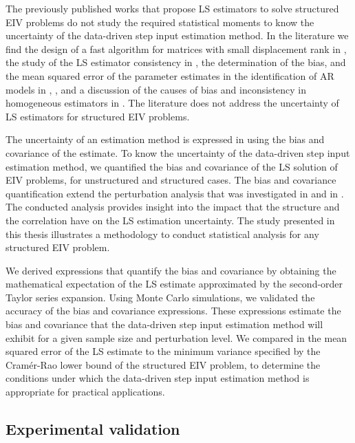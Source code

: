 The previously published works that propose LS estimators to solve structured EIV problems do not study the required statistical moments to know the uncertainty of the data-driven step input estimation method.
In the literature we find 
the design of a fast algorithm for matrices with small displacement rank in \citet{Mastronardi07fast}, 
the study of the LS estimator consistency in \citet{Palanthandalam10parameter},
the determination of the bias, and the mean squared error of the parameter estimates in the identification of AR models in \citet{Kiviet12high}, \citet{Kiviet14improved}, and
a discussion of the causes of bias and inconsistency in homogeneous estimators in \citet{Yeredor04homogeneous}.
The literature does not address the uncertainty of LS estimators for structured EIV problems.

The uncertainty of an estimation method is expressed in \citet{Pintelon12Book} using the bias and covariance of the estimate.
To know the uncertainty of the data-driven step input estimation method, we quantified the bias and covariance of the LS solution of EIV problems, for unstructured and structured cases. 
The bias and covariance quantification extend the perturbation analysis that was investigated in \citet{Stewart90SPT} and in \citet{Vaccaro94}.
The conducted analysis provides insight into the impact that the structure and the correlation have on the LS estimation uncertainty.
The study presented in this thesis illustrates a methodology to conduct statistical analysis for any structured EIV problem.

We derived expressions that quantify the bias and covariance by obtaining the mathematical expectation of the LS estimate approximated by the second-order Taylor series expansion.
Using Monte Carlo simulations, we validated the accuracy of the bias and covariance expressions.
These expressions estimate the bias and covariance that the data-driven step input estimation method will exhibit for a given sample size and perturbation level.
We compared in \citet{QuintanaCSDA} the mean squared error of the LS estimate to the minimum variance specified by the Cram\'er-Rao lower bound of the structured EIV problem, to determine the conditions under which the data-driven step input estimation method is appropriate for practical applications.

\subsection{Experimental validation}

